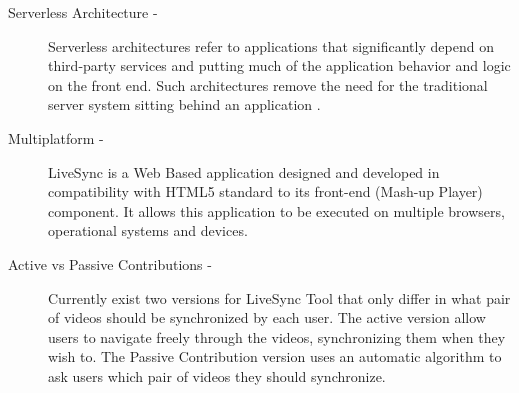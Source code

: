 \begin{description}
	\item[Serverless Architecture -] Serverless architectures refer to applications that significantly depend on third-party services and putting much of the application behavior and logic on the front end. Such architectures remove the need for the traditional server system sitting behind an application \cite{RobertServerless}.
	
	\item[Multiplatform -] LiveSync is a Web Based application designed and developed in compatibility with HTML5 standard to its front-end (Mash-up Player) component. It allows this application to be executed on multiple browsers, operational systems and devices.
	
	\item[Active vs Passive Contributions -] Currently  exist two versions for LiveSync Tool that only differ in what pair of videos should be synchronized by each user. The active version allow users to navigate freely through the videos, synchronizing them when they wish to. The Passive Contribution version uses an automatic algorithm to ask users which pair of videos they should synchronize.

	
\end{description}